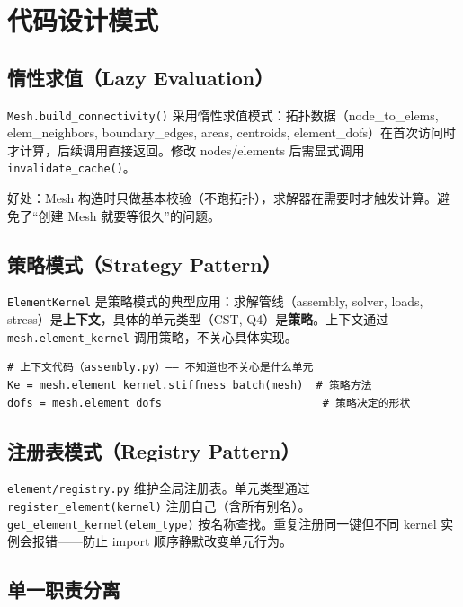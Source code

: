 \documentclass[12pt,a4paper]{ctexart}
\begin{document}
\section{代码设计模式}

\subsection{惰性求值（Lazy Evaluation）}

\texttt{Mesh.build\_connectivity()} 采用惰性求值模式：拓扑数据（node\_to\_elems, elem\_neighbors, boundary\_edges, areas, centroids, element\_dofs）在首次访问时才计算，后续调用直接返回。修改 nodes/elements 后需显式调用 \texttt{invalidate\_cache()}。

好处：Mesh 构造时只做基本校验（不跑拓扑），求解器在需要时才触发计算。避免了“创建 Mesh 就要等很久”的问题。

\subsection{策略模式（Strategy Pattern）}

\texttt{ElementKernel} 是策略模式的典型应用：求解管线（assembly, solver, loads, stress）是\textbf{上下文}，具体的单元类型（CST, Q4）是\textbf{策略}。上下文通过 \texttt{mesh.element\_kernel} 调用策略，不关心具体实现。

\begin{lstlisting}
# 上下文代码（assembly.py）—— 不知道也不关心是什么单元
Ke = mesh.element_kernel.stiffness_batch(mesh)  # 策略方法
dofs = mesh.element_dofs                         # 策略决定的形状
\end{lstlisting}

\subsection{注册表模式（Registry Pattern）}

\texttt{element/registry.py} 维护全局注册表。单元类型通过 \texttt{register\_element(kernel)} 注册自己（含所有别名）。\texttt{get\_element\_kernel(elem\_type)} 按名称查找。重复注册同一键但不同 kernel 实例会报错——防止 import 顺序静默改变单元行为。

\subsection{单一职责分离}
\end{document}
